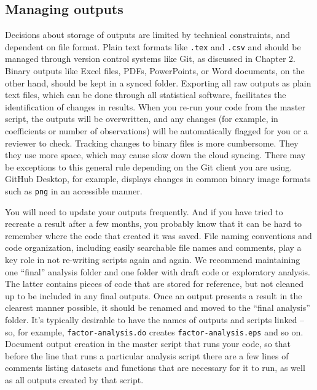 \subsection{Managing outputs}

Decisions about storage of outputs are limited by technical constraints,
and dependent on file format.
Plain text formats like \texttt{.tex} and \texttt{.csv}
and should be managed through version control systems like Git,
as discussed in Chapter 2.
Binary outputs like Excel files, PDFs, PowerPoints, or Word documents,
on the other hand, should be kept in a synced folder.
Exporting all raw outputs as plain text files, 
which can be done through all statistical software,
facilitates the identification of changes in results.
When you re-run your code from the master script,
the outputs will be overwritten,
and any changes (for example, in coefficients or number of observations)
will be automatically flagged for you or a reviewer to check.
Tracking changes to binary files is more cumbersome.
They they use more space, 
which may cause slow down the cloud syncing.
There may be exceptions to this general rule
depending on the Git client you are using.
GitHub Desktop, for example,
displays changes in common binary image formats such as \texttt{png}
in an accessible manner.

You will need to update your outputs frequently.
And if you have tried to recreate a result after a few months,
you probably know that it can be hard to remember where the code that created it was saved.
File naming conventions and code organization,
including easily searchable file names and comments,
play a key role in not re-writing scripts again and again.
We recommend maintaining one ``final'' analysis folder
and one folder with draft code or exploratory analysis.
The latter contains pieces of code that are stored for reference,
but not cleaned up to be included in any final outputs.
Once an output presents a result in the clearest manner possible,
it should be renamed and moved to the ``final analysis'' folder.
It's typically desirable to have the names of outputs and scripts linked --
so, for example, \texttt{factor-analysis.do} creates \texttt{factor-analysis.eps} and so on.
Document output creation in the master script that runs your code,
so that before the line that runs a particular analysis script
there are a few lines of comments listing
datasets and functions that are necessary for it to run,
as well as all outputs created by that script.

